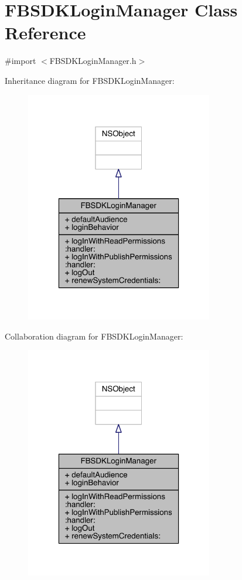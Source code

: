 \hypertarget{interface_f_b_s_d_k_login_manager}{\section{F\-B\-S\-D\-K\-Login\-Manager Class Reference}
\label{interface_f_b_s_d_k_login_manager}
}


{\ttfamily \#import $<$F\-B\-S\-D\-K\-Login\-Manager.\-h$>$}



Inheritance diagram for F\-B\-S\-D\-K\-Login\-Manager\-:
\nopagebreak
\begin{figure}[H]
\begin{center}
\leavevmode
\includegraphics[width=232pt]{interface_f_b_s_d_k_login_manager__inherit__graph}
\end{center}
\end{figure}


Collaboration diagram for F\-B\-S\-D\-K\-Login\-Manager\-:
\nopagebreak
\begin{figure}[H]
\begin{center}
\leavevmode
\includegraphics[width=232pt]{interface_f_b_s_d_k_login_manager__coll__graph}
\end{center}
\end{figure}
